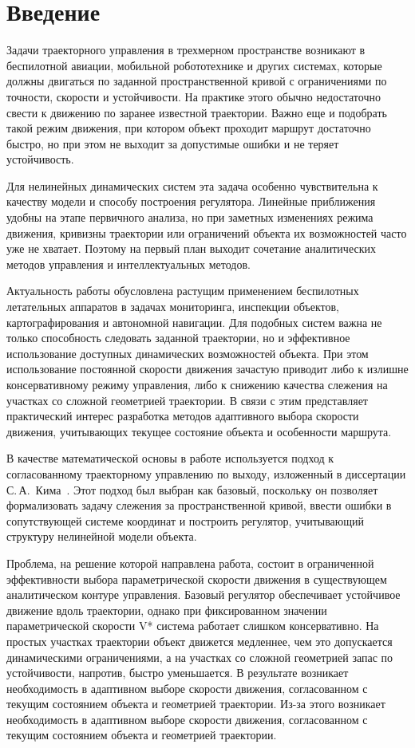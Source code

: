 \chapter*{Введение}

Задачи траекторного управления в трехмерном пространстве возникают в беспилотной авиации, мобильной робототехнике и других системах, которые должны двигаться по заданной пространственной кривой с ограничениями по точности, скорости и устойчивости.
На практике этого обычно недостаточно свести к движению по заранее известной траектории.
Важно еще и подобрать такой режим движения, при котором объект проходит маршрут достаточно быстро, но при этом не выходит за допустимые ошибки и не теряет устойчивость.

Для нелинейных динамических систем эта задача особенно чувствительна к качеству модели и способу построения регулятора.
Линейные приближения удобны на этапе первичного анализа, но при заметных изменениях режима движения, кривизны траектории или ограничений объекта их возможностей часто уже не хватает.
Поэтому на первый план выходит сочетание аналитических методов управления и интеллектуальных методов.

Актуальность работы обусловлена растущим применением беспилотных летательных аппаратов в задачах мониторинга, инспекции объектов, картографирования и автономной навигации.
Для подобных систем важна не только способность следовать заданной траектории, но и эффективное использование доступных динамических возможностей объекта.
При этом использование постоянной скорости движения зачастую приводит либо к излишне консервативному режиму управления, либо к снижению качества слежения на участках со сложной геометрией траектории.
В связи с этим представляет практический интерес разработка методов адаптивного выбора скорости движения, учитывающих текущее состояние объекта и особенности маршрута.

В качестве математической основы в работе используется подход к согласованному траекторному управлению по выходу, изложенный в диссертации С.\,А.~Кима~\cite{kim_algorithms}.
Этот подход был выбран как базовый, поскольку он позволяет формализовать задачу слежения за пространственной кривой, ввести ошибки в сопутствующей системе координат и построить регулятор, учитывающий структуру нелинейной модели объекта.

Проблема, на решение которой направлена работа, состоит в ограниченной эффективности выбора параметрической скорости движения в существующем аналитическом контуре управления.
Базовый регулятор обеспечивает устойчивое движение вдоль траектории, однако при фиксированном значении параметрической скорости V* система работает слишком консервативно.
На простых участках траектории объект движется медленнее, чем это допускается динамическими ограничениями, а на участках со сложной геометрией запас по устойчивости, напротив, быстро уменьшается.
В результате возникает необходимость в адаптивном выборе скорости движения, согласованном с текущим состоянием объекта и геометрией траектории.
Из-за этого возникает необходимость в адаптивном выборе скорости движения, согласованном с текущим состоянием объекта и геометрией траектории.

